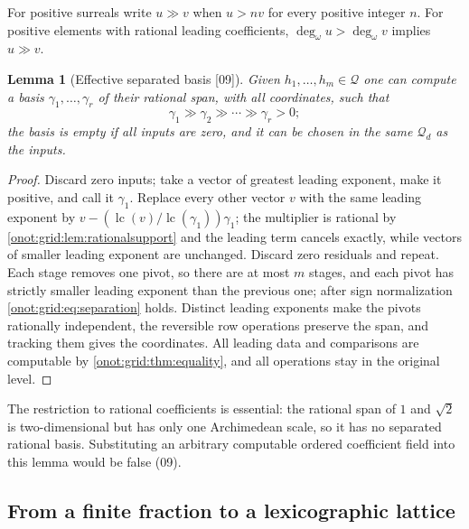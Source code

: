 \documentclass[11pt,oneside]{article}
\numberwithin{equation}{section}
\newtheorem{lemma}[lemma]{Lemma}
\theoremstyle{definition}
\theoremstyle{remark}
\newcommand{\QO}{\mathcal Q}
\newcommand{\lc}{\operatorname{lc}}
\newcommand{\ddeg}{\operatorname{deg}_{\omega}}
\newcommand{\src}[1]{\textup{\textsf{\small[#1]}}}
\begin{document}
For positive surreals write $u\gg v$ when $u>nv$ for every positive integer $n$.
For positive elements with rational leading coefficients, $\ddeg u>\ddeg v$
implies $u\gg v$.

\begin{lemma}[Effective separated basis \src{09}]\label{onot:grid:lem:basis}
Given $h_1,\ldots,h_m\in\QO$ one can compute a basis $\gamma_1,\ldots,\gamma_r$
of their rational span, with all coordinates, such that
\begin{equation}\label{onot:grid:eq:separation}
 \gamma_1\gg\gamma_2\gg\cdots\gg\gamma_r>0;
\end{equation}
the basis is empty if all inputs are zero, and it can be chosen in the same
$\QO_d$ as the inputs.
\end{lemma}
\begin{proof}
Discard zero inputs; take a vector of greatest leading exponent, make it positive,
and call it $\gamma_1$. Replace every other vector $v$ with the same leading
exponent by $v-(\lc(v)/\lc(\gamma_1))\gamma_1$; the multiplier is rational by
\cref{onot:grid:lem:rationalsupport} and the leading term cancels exactly, while
vectors of smaller leading exponent are unchanged. Discard zero residuals and
repeat. Each stage removes one pivot, so there are at most $m$ stages, and each
pivot has strictly smaller leading exponent than the previous one; after sign
normalization \eqref{onot:grid:eq:separation} holds. Distinct leading exponents
make the pivots rationally independent, the reversible row operations preserve
the span, and tracking them gives the coordinates. All leading data and
comparisons are computable by \cref{onot:grid:thm:equality}, and all operations
stay in the original level.
\end{proof}

The restriction to rational coefficients is essential: the rational span of $1$
and $\sqrt2$ is two-dimensional but has only one Archimedean scale, so it has no
separated rational basis. Substituting an arbitrary computable ordered
coefficient field into this lemma would be false (09).

\subsection{From a finite fraction to a lexicographic lattice}
\end{document}
